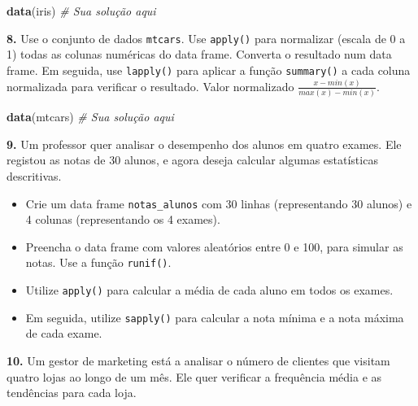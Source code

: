 \documentclass[
]{book}
\newenvironment{Shaded}{\begin{snugshade}}{\end{snugshade}}
\newcommand{\CommentTok}[1]{\textcolor[rgb]{0.56,0.35,0.01}{\textit{#1}}}
\newcommand{\FunctionTok}[1]{\textcolor[rgb]{0.13,0.29,0.53}{\textbf{#1}}}
\newcommand{\NormalTok}[1]{#1}
\providecommand{\tightlist}{%
  \setlength{\itemsep}{0pt}\setlength{\parskip}{0pt}}
\begin{document}
\begin{Shaded}
\begin{Highlighting}[]
\FunctionTok{data}\NormalTok{(iris)}
\CommentTok{\# Sua solução aqui}
\end{Highlighting}
\end{Shaded}

\textbf{8.} Use o conjunto de dados \texttt{mtcars}. Use \texttt{apply()} para normalizar
(escala de 0 a 1) todas as colunas numéricas do data frame. Converta o resultado num data frame. Em seguida,
use \texttt{lapply()} para aplicar a função \texttt{summary()} a cada coluna
normalizada para verificar o resultado. Valor normalizado \(\frac{x-min(x)}{max(x)-min(x)}\).

\begin{Shaded}
\begin{Highlighting}[]
\FunctionTok{data}\NormalTok{(mtcars)}
\CommentTok{\# Sua solução aqui}
\end{Highlighting}
\end{Shaded}

\textbf{9.} Um professor quer analisar o desempenho dos alunos em quatro exames. Ele registou as notas de 30 alunos, e agora deseja calcular algumas estatísticas descritivas.

\begin{itemize}
\tightlist
\item
  Crie um data frame \texttt{notas\_alunos} com 30 linhas (representando 30 alunos) e 4 colunas (representando os 4 exames).
\item
  Preencha o data frame com valores aleatórios entre 0 e 100, para simular as notas. Use a função \texttt{runif()}.
\item
  Utilize \texttt{apply()} para calcular a média de cada aluno em todos os exames.
\item
  Em seguida, utilize \texttt{sapply()} para calcular a nota mínima e a nota máxima de cada exame.
\end{itemize}

\textbf{10.} Um gestor de marketing está a analisar o número de clientes que visitam quatro lojas ao longo de um mês. Ele quer verificar a frequência média e as tendências para cada loja.
\end{document}
